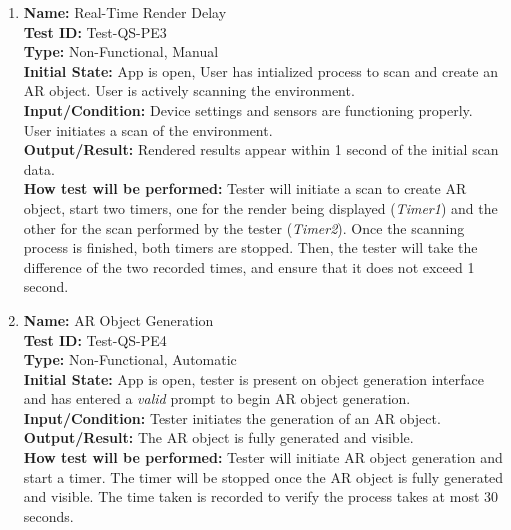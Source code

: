 \documentclass[12pt, titlepage]{article}
\begin{document}
\begin{enumerate}
  \item \textbf{Name:} Real-Time Render Delay \label{itm:Test-QS-PE3} \\
        \textbf{Test ID:} Test-QS-PE3 \\
        \textbf{Type:} Non-Functional, Manual \\
        \textbf{Initial State:} App is open, User has intialized process to scan and create an AR object. User is actively scanning the environment. \\
        \textbf{Input/Condition:} Device settings and sensors are functioning properly. User initiates a scan of the environment. \\
        \textbf{Output/Result:} Rendered results appear within 1 second of the initial scan data. \\
        \textbf{How test will be performed:} Tester will initiate a scan to create AR object, start two timers, one for the render being displayed (\textit{Timer1}) and the other for the scan performed by the tester (\textit{Timer2}). Once the scanning process is finished, both timers are stopped. Then, the tester will take the difference of the two recorded times, and ensure that it does not exceed 1 second. \\

  \item \textbf{Name:} AR Object Generation \label{itm:Test-QS-PE4} \\
        \textbf{Test ID:} Test-QS-PE4 \\
        \textbf{Type:} Non-Functional, Automatic \\
        \textbf{Initial State:} App is open, tester is present on object generation interface and has entered a \textit{valid} prompt to begin AR object generation. \\
        \textbf{Input/Condition:} Tester initiates the generation of an AR object. \\
        \textbf{Output/Result:} The AR object is fully generated and visible. \\
        \textbf{How test will be performed:} Tester will initiate AR object generation and start a timer. The timer will be stopped once the AR object is fully generated and visible. The time taken is recorded to verify the process takes at most 30 seconds. \\


\end{enumerate}
\end{document}
